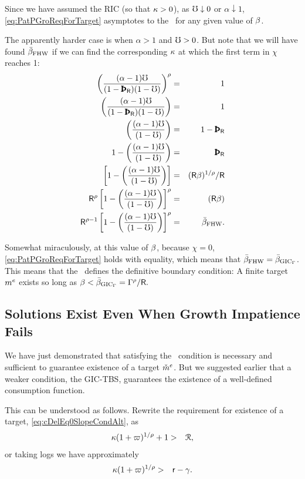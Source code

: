 \documentclass{handout}
\begin{document}
Since we have assumed the RIC (so that $\kappa > 0$), as $\mho \downarrow 0$ or $\alpha \downarrow 1$, \eqref{eq:PatPGroReqForTarget} asymptotes to the \GICPGro~for any given value of $\beta$.  

The apparently harder case is when $\alpha>1$ and $\mho > 0$.  But note that we will have found $\bar{\beta}_{\text{FHW}}$ if we can find the corresponding $\kappa$ at which the first term in $\chi$ reaches 1:
\begin{eqnarray}
    \left(\frac{(\alpha-1)\urate}{(1-\PatR) (1-\urate)}\right)^{\CRRA} & = & 1
\\  \left(\frac{(\alpha-1)\urate}{(1-\PatR) (1-\urate)}\right) & = & 1
\\  \left(\frac{(\alpha-1)\urate}{ (1-\urate)}\right) & = & 1-\PatR
\\  1-\left(\frac{(\alpha-1)\urate}{ (1-\urate)}\right) & = & \PatR
\\                  \left[1-\left(\frac{(\alpha-1)\urate}{ (1-\urate)}\right)\right] & = & (\Rfree \Discount)^{1/\CRRA}/\Rfree
\\  \Rfree^{\CRRA}  \left[1-\left(\frac{(\alpha-1)\urate}{ (1-\urate)}\right)\right]^{\CRRA} & = & (\Rfree \Discount)
\\  \Rfree^{\CRRA-1}\left[1-\left(\frac{(\alpha-1)\urate}{ (1-\urate)}\right)\right]^{\CRRA} & = & \DiscountMaxGICWhenFHWCTBSHolds \label{eq:DiscountMaxGICWhenFHWCTBSHoldsAndGICPGroIsExactlySatisfied}
.\end{eqnarray}

Somewhat miraculously, at this value of $\beta$, because $\chi=0$, \eqref{eq:PatPGroReqForTarget} holds with equality, which means that $\bar{\beta}_{\text{FHW}}=\bar{\beta}_{\text{GIC}_{\Gamma}}$.  This means that the \GICPGro~defines the definitive boundary condition:  A finite target $m^{e}$ exists so long as $\beta < \bar{\beta}_{\text{GIC}_{\Gamma}} = \Gamma^{\rho}/\mathsf{R}.$

\subsection{Solutions Exist Even When Growth Impatience Fails}

We have just demonstrated that satisfying the \GICPGro~condition is necessary and sufficient to guarantee existence of a target $\check{m}^{e}$.  But we suggested earlier that a weaker condition, the GIC-TBS, guarantees the existence of a well-defined consumption function.

This can be understood as follows.  Rewrite the requirement for existence of a target, \eqref{eq:cDelEq0SlopeCondAlt}, as 
\begin{eqnarray}
  \kappa (1+\varpi)^{1/\rho}+1 & > &  \mathcal{R}  \label{eq:cDelEq0SlopeCondAltAlt}
,\end{eqnarray}
or taking logs we have approximately 
\begin{eqnarray}
  \kappa (1+\varpi)^{1/\rho} & > &  \mathsf{r}-\gamma \label{eq:cDelEq0SlopeCondLog}
.\end{eqnarray}
\end{document}
